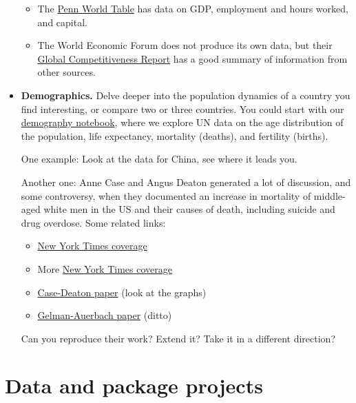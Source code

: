 \documentclass[11pt]{article}
\begin{document}
\begin{itemize}
\begin{itemize}
\item The \href{http://www.rug.nl/research/ggdc/data/pwt/}{Penn World Table}
has data on GDP, employment and hours worked,
and capital.

\item The World Economic Forum does not produce its own data,
but their
\href{http://reports.weforum.org/global-competitiveness-report-2015-2016/}
{Global Competitiveness Report}
has a good summary of information from other sources.
\end{itemize}

\item {\bf Demographics.\/} Delve deeper into the population dynamics of a country
you find interesting, or compare two or three countries.
You could start with our
\href{https://github.com/DaveBackus/Data_Bootcamp/blob/master/Code/Lab/UN_demography.ipynb}
{demography notebook},
where we explore UN data on
the age distribution of the population, life expectancy, mortality (deaths), and fertility (births).

One example:  Look at the data for China, see where it leads you.

Another one:  Anne Case and Angus Deaton generated a lot of discussion,
and some controversy, when they documented an increase in mortality of middle-aged white men in the US
and their causes of death, including suicide and drug overdose.
Some related links:
%
\begin{itemize}
\item
\href{http://www.nytimes.com/2015/11/03/health/death-rates-rising-for-middle-aged-white-americans-study-finds.html}
    {New York Times coverage}

\item More
\href{http://www.nytimes.com/2015/11/07/upshot/more-details-on-rising-mortality-among-middle-aged-whites.html}
    {New York Times coverage}

\item \href{http://www.pnas.org/content/112/49/15078.full.pdf}{Case-Deaton paper} (look at the graphs)

\item \href{http://andrewgelman.com/wp-content/uploads/2017/04/ageadj.pdf}{Gelman-Auerbach paper} (ditto)

\end{itemize}
Can you reproduce their work?  Extend it?  Take it in a different direction?
\end{itemize}


\section*{Data and package projects}
\end{document}
